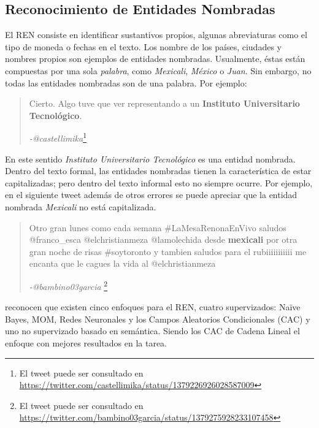 \subsection{Reconocimiento de Entidades Nombradas}

El REN consiste en identificar sustantivos propios, algunas abreviaturas como el tipo de moneda o fechas en el texto. Los nombre de los países, ciudades y nombres propios son ejemplos de entidades nombradas. Usualmente, éstas están compuestas por una sola \textit{palabra}, como \textit{Mexicali}, \textit{México} o \textit{Juan}. Sin embargo, no todas las entidades nombradas son de una palabra. Por ejemplo:

\begin{quotation}
	Cierto. Algo tuve que ver representando a un \textbf{Instituto Universitario Tecnológico}.\\ \begin{flushright}
		\textit{-@castellimika}\footnote{El tweet puede ser consultado en \url{https://twitter.com/castellimika/status/1379226926028587009}}
	\end{flushright}
\end{quotation}
En este sentido \textit{Instituto Universitario Tecnológico} es una entidad nombrada. Dentro del texto formal, las entidades nombradas tienen la característica de estar capitalizadas; pero dentro del texto informal esto no siempre ocurre. Por ejemplo, en el siguiente tweet además de otros errores se puede apreciar que la entidad nombrada \textit{Mexicali} no está capitalizada.

\begin{quotation}
	Otro gran lunes como cada semana \#LaMesaRenonaEnVivo saludos @franco\_esca @elchristianmeza @lamolechida desde \textbf{mexicali} por otra gran noche de risas \#soytoronto y tambien saludos para el rubiiiiiiiiiii me encanta que le cagues la vida al @elchristianmeza\\ \begin{flushright}
		\textit{-@bambino03garcia
		}\footnote{El tweet puede ser consultado en \url{https://twitter.com/bambino03garcia/status/1379275928233107458}}
	\end{flushright}
\end{quotation}

\cite{nouvel2016named} reconocen que existen cinco enfoques para el REN, cuatro supervizados: Naïve Bayes, MOM, Redes Neuronales y los Campos Aleatorios Condicionales (CAC) y uno no supervizado basado en semántica. Siendo los CAC de Cadena Lineal el enfoque con mejores resultados en la tarea.


